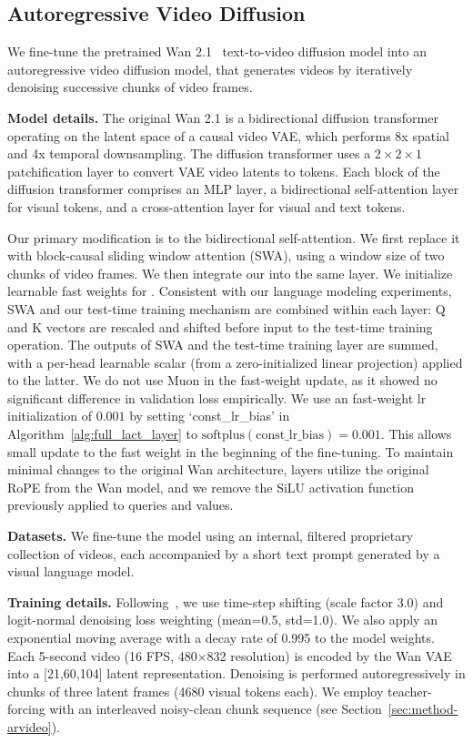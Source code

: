 \documentclass{article}
\begin{document}
\subsection{Autoregressive Video Diffusion}
\label{sec:appen_exp_video}
We fine-tune the pretrained Wan 2.1~\cite{wang2025wan} text-to-video diffusion model into an autoregressive video diffusion model, that generates videos by iteratively denoising successive chunks of video frames.

\noindent\textbf{Model details.}  The original Wan 2.1 is a bidirectional diffusion transformer operating on the latent space of a causal video VAE, which performs 8x spatial and 4x temporal downsampling. The diffusion transformer uses a $2\times2\times1$ patchification layer to convert VAE video latents to tokens.   Each block of the diffusion transformer comprises an MLP layer, a bidirectional self-attention layer for visual tokens, and a cross-attention layer for visual and text tokens. 

Our primary modification is to the bidirectional self-attention. We first replace it with block-causal sliding window attention (SWA), using a window size of two chunks of video frames. We then integrate our \methodname{} into the same layer. We initialize learnable fast weights for \methodname{}. Consistent with our language modeling experiments, SWA and our test-time training mechanism are combined within each layer: Q and K vectors are rescaled and shifted before input to the test-time training operation. The outputs of SWA and the test-time training layer are summed, with a per-head learnable scalar (from a zero-initialized linear projection) applied to the latter. We do not use Muon in the fast-weight update, as it showed no significant difference in validation loss empirically. 
We use an fast-weight lr initialization of $0.001$ by setting `const\_lr\_bias' in Algorithm~\ref{alg:full_lact_layer} to $\mathrm{softplus}(\text{const\_lr\_bias}) = 0.001$.
This allows small update to the fast weight in the beginning of the fine-tuning.  To maintain minimal changes to the original Wan architecture, \methodname{} layers utilize the original RoPE from the Wan model, and we remove the SiLU activation function previously applied to queries and values.

\noindent\textbf{Datasets.} We fine-tune the model using an internal, filtered proprietary collection of videos, each accompanied by a short text prompt generated by a visual language model\cite{chen2024internvl}.

\noindent\textbf{Training details.}
Following~\cite{esser2403scaling, wang2025wan}, we use time-step shifting (scale factor 3.0) and logit-normal denoising loss weighting (mean=0.5, std=1.0). We also apply an exponential moving average with a decay rate of 0.995 to the model weights.  Each 5-second video (16 FPS, 480×832 resolution) is encoded by the Wan VAE into a [21,60,104] latent representation. Denoising is performed autoregressively in chunks of three latent frames (4680 visual tokens each). We employ teacher-forcing with an interleaved noisy-clean chunk sequence (see Section~\ref{sec:method-arvideo}). 
\end{document}
